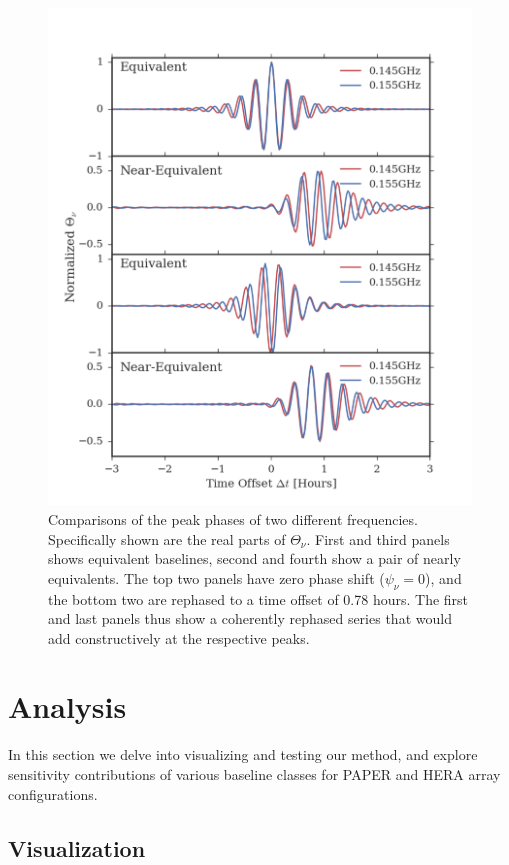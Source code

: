 \documentclass[twocolumn,apj,numberedappendix]{emulateapj}
\renewcommand\[{\begin{equation}}
\renewcommand\]{\end{equation}}
\begin{document}
\begin{figure}[H]
\includegraphics[width=1.1\linewidth]{rephs_rb}

\caption{Comparisons of the peak phases of two different frequencies. Specifically shown are the real parts of $\Theta_{\nu}$. First and third panels shows equivalent baselines, second and fourth show a pair of nearly equivalents. The top two panels have zero phase shift ($\psi_{\nu}=0$), and the bottom two are rephased to a time offset of 0.78 hours. The first and last panels thus show a coherently rephased series that would add constructively at the respective peaks. }
\label{fig:freqdiff}
\end{figure}

\section{Analysis}

In this section we delve into visualizing and testing our method, and explore sensitivity contributions of various baseline classes for PAPER and HERA array configurations. 
\subsection{Visualization \label{sec:visual}}
\end{document}
